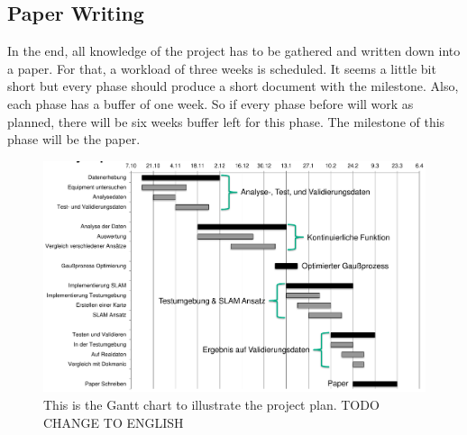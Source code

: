 \subsection{Paper Writing}
In the end, all knowledge of the project has to be gathered and written down into a paper. For that, a workload of three weeks is scheduled. It seems a little bit short but every phase should produce a short document with the milestone. Also, each phase has a buffer of one week. So if every phase before will work as planned, there will be six weeks buffer left for this phase. The milestone of this phase will be the paper. 

\begin{figure}[hp]
	\centering
	\captionsetup{justification=centering,margin=1cm}
	\includegraphics[width=\textwidth]{images/workplan.png}
	\caption{
		This is the Gantt chart to illustrate the project plan. TODO CHANGE TO ENGLISH
	}
	\label{fig:workplan}
\end{figure}